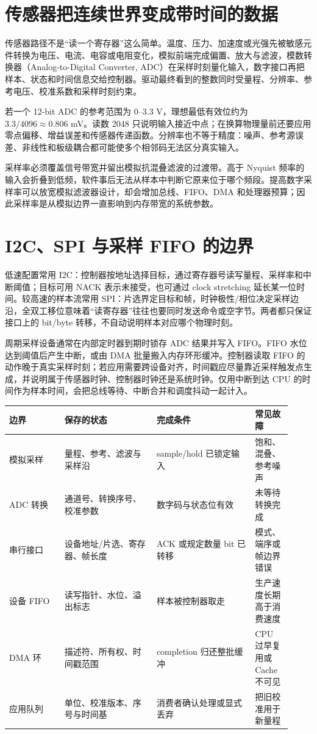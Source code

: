 \section{传感器把连续世界变成带时间的数据}

传感器路径不是“读一个寄存器”这么简单。温度、压力、加速度或光强先被敏感元件转换为电压、电流、电容或电阻变化，模拟前端完成偏置、放大与滤波，模数转换器（Analog-to-Digital Converter, ADC）在采样时刻量化输入，数字接口再把样本、状态和时间信息交给控制器。驱动最终看到的整数同时受量程、分辨率、参考电压、校准系数和采样时刻约束。

若一个 12-bit ADC 的参考范围为 0--3.3 V，理想最低有效位约为 $3.3/4096\approx0.806$ mV。读数 2048 只说明输入接近中点；在换算物理量前还要应用零点偏移、增益误差和传感器传递函数。分辨率也不等于精度：噪声、参考源误差、非线性和板级耦合都可能使多个相邻码无法区分真实输入。

采样率必须覆盖信号带宽并留出模拟抗混叠滤波的过渡带。高于 Nyquist 频率的输入会折叠到低频，软件事后无法从样本中判断它原来位于哪个频段。提高数字采样率可以放宽模拟滤波器设计，却会增加总线、FIFO、DMA 和处理器预算；因此采样率是从模拟边界一直影响到内存带宽的系统参数。

\section{I2C、SPI 与采样 FIFO 的边界}

低速配置常用 I2C：控制器按地址选择目标，通过寄存器号读写量程、采样率和中断阈值；目标可用 NACK 表示未接受，也可通过 clock stretching 延长某一位时间。较高速的样本流常用 SPI：片选界定目标和帧，时钟极性/相位决定采样边沿，全双工移位意味着“读寄存器”往往也要同时发送命令或空字节。两者都只保证接口上的 bit/byte 转移，不自动说明样本对应哪个物理时刻。

周期采样设备通常在内部定时器到期时锁存 ADC 结果并写入 FIFO。FIFO 水位达到阈值后产生中断，或由 DMA 批量搬入内存环形缓冲。控制器读取 FIFO 的动作晚于真实采样时刻；若应用需要跨设备对齐，时间戳应尽量靠近采样触发点生成，并说明属于传感器时钟、控制器时钟还是系统时钟。仅用中断到达 CPU 的时间作为样本时间，会把总线等待、中断合并和调度抖动一起计入。

\begin{longtable}{L{0.18\linewidth}L{0.30\linewidth}L{0.32\linewidth}L{0.12\linewidth}}
\toprule
边界 & 保存的状态 & 完成条件 & 常见故障 \\
\midrule
模拟采样 & 量程、参考、滤波与采样沿 & sample/hold 已锁定输入 & 饱和、混叠、参考噪声 \\
ADC 转换 & 通道号、转换序号、校准参数 & 数字码与状态位有效 & 未等待转换完成 \\
串行接口 & 设备地址/片选、寄存器、帧长度 & ACK 或规定数量 bit 已转移 & 模式、端序或帧边界错误 \\
设备 FIFO & 读写指针、水位、溢出标志 & 样本被控制器取走 & 生产速度长期高于消费速度 \\
DMA 环 & 描述符、所有权、时间戳范围 & completion 归还整批缓冲 & CPU 过早复用或 Cache 不可见 \\
应用队列 & 单位、校准版本、序号与时间基 & 消费者确认处理或显式丢弃 & 把旧校准用于新量程 \\
\bottomrule
\end{longtable}

